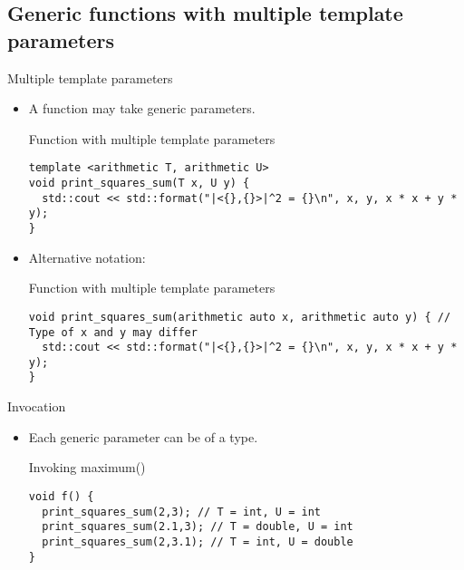 \subsection{Generic functions with multiple template parameters}

\begin{frame}[t,fragile]{Multiple template parameters}
\begin{itemize}
  \item A function may take  generic parameters.

\begin{block}{Function with multiple template parameters}
\begin{lstlisting}
template <arithmetic T, arithmetic U>
void print_squares_sum(T x, U y) {
  std::cout << std::format("|<{},{}>|^2 = {}\n", x, y, x * x + y * y);
}
\end{lstlisting}
\end{block}

  \item Alternative notation:

\begin{block}{Function with multiple template parameters}
\begin{lstlisting}
void print_squares_sum(arithmetic auto x, arithmetic auto y) { // Type of x and y may differ
  std::cout << std::format("|<{},{}>|^2 = {}\n", x, y, x * x + y * y);
}
\end{lstlisting}
\end{block}

\end{itemize}
\end{frame}

\begin{frame}[t,fragile]{Invocation}
\begin{itemize}
  \item Each generic parameter can be of a  type.

\begin{block}{Invoking maximum()}
\begin{lstlisting}
void f() {
  print_squares_sum(2,3); // T = int, U = int
  print_squares_sum(2.1,3); // T = double, U = int
  print_squares_sum(2,3.1); // T = int, U = double
}
\end{lstlisting}
\end{block}

\end{itemize}
\end{frame}
